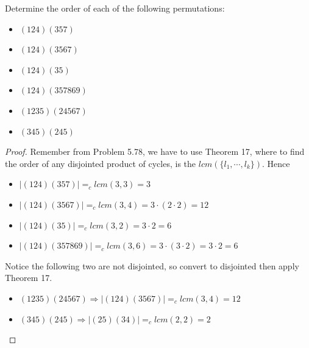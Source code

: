 \begin{assignment}[
  header=HeaderA,
  body=BodyA,
  title={Homework 3},
  duedate={26 February, 2026},
  toc=false,
  toctitle={This appears on the Table of contents.},
  exlist=false
]
\begin{exer}[Problem 5.5]
Determine the order of each of the following permutations:
\begin{itemize}
    \item[a] $(124)(357)$
    \item[b] $(124)(3567)$
    \item[c] $(124)(35)$
    \item[d] $(124)(357869)$
    \item[e] $(1235)(24567)$
    \item[f] $(345)(245)$
\end{itemize}
\begin{proof}
Remember from Problem 5.78, we have to use Theorem 17, where to find the order of any disjointed product of cycles, is the $lcm(\{l_1, \cdots, l_k\})$. Hence
\begin{itemize}
    \item[a] $|(124)(357)| =_c lcm(3,3) = 3$ 
    \item[b] $|(124)(3567)| =_c lcm(3,4) = 3 \cdot (2\cdot 2) = 12$
    \item[c] $|(124)(35)| =_c lcm(3,2) = 3 \cdot 2 = 6$
    \item[d] $|(124)(357869)| =_c lcm(3,6) = 3 \cdot (3 \cdot 2) =  3 \cdot 2 = 6$
\end{itemize}
Notice the following two are not disjointed, so convert to disjointed then apply Theorem 17.
\begin{itemize}
    \item[e] $(1235)(24567) \Rightarrow |(124)(3567)| =_c lcm(3,4) = 12$
    \item[f] $(345)(245) \Rightarrow |(25)(34)| =_c lcm(2,2) = 2$ 
\end{itemize}
\end{proof}
\end{exer}


\end{assignment}
